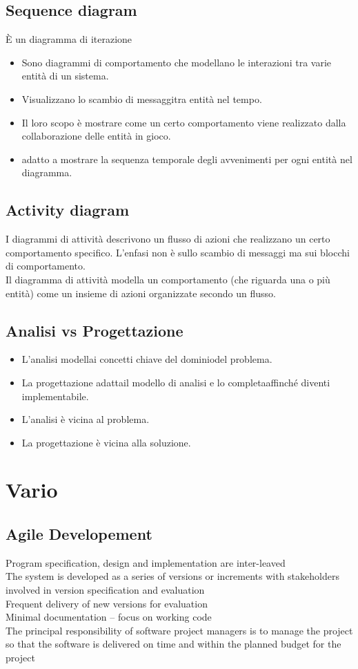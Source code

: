 \documentclass[12pt]{article}
\begin{document}
\subsection{Sequence diagram}
È un diagramma di iterazione
\begin{itemize}
\item Sono diagrammi di comportamento che modellano le interazioni tra varie entità di un sistema.
\item Visualizzano lo scambio di messaggitra entità nel tempo.
\item Il loro scopo è mostrare come un certo comportamento viene realizzato dalla collaborazione delle entità in gioco.
\item adatto a mostrare la sequenza temporale degli avvenimenti per ogni entità nel diagramma.
\end{itemize}

\subsection{Activity diagram}
I diagrammi di attività descrivono un flusso di azioni che
realizzano un certo comportamento specifico. L’enfasi non
è sullo scambio di messaggi ma sui blocchi di
comportamento.
\\
Il diagramma di attività modella un comportamento (che
riguarda una o più entità) come un insieme di azioni
organizzate secondo un flusso.
\subsection{Analisi vs Progettazione}
\begin{itemize}
\item L’analisi modellai concetti chiave del dominiodel problema.
\item La progettazione adattail modello di analisi e lo completaaffinché diventi implementabile.
\item L’analisi è vicina al problema.
\item La progettazione è vicina alla soluzione.
\end{itemize}

\section{Vario}
\subsection{Agile Developement}
Program specification, design and implementation are inter-leaved
\\
The system is developed as a series of versions or increments with stakeholders involved in version specification and evaluation
\\
Frequent delivery of new versions for evaluation
\\
Minimal documentation – focus on working code
\\
The principal responsibility of software project managers is to manage the project so that the software is delivered on time and within the planned budget for the project
\end{document}
